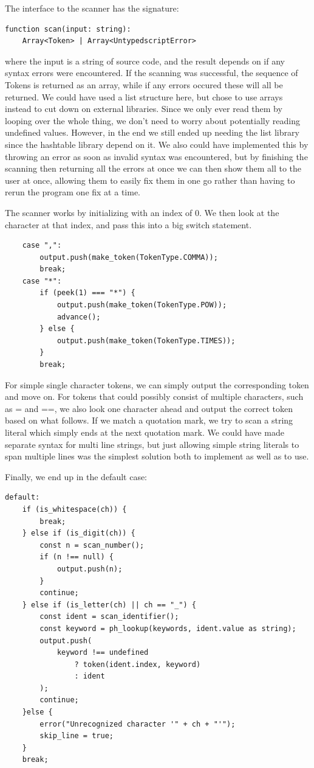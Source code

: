 \documentclass[12pt,a4paper]{article}
\begin{document}
The interface to the scanner has the signature:
\begin{lstlisting}[frame = none]
function scan(input: string): 
    Array<Token> | Array<UntypedscriptError>
\end{lstlisting}
where the input is a string of source code, and the result depends on if any syntax errors were encountered. If the scanning was successful, the sequence of Tokens is returned as an array, while if any errors occured these will all be returned. 
We could have used a list structure here, but chose to use arrays instead to cut down on external libraries. Since we only ever read them by looping over the whole thing, we don't need to worry about potentially reading undefined values. However, in the end we still ended up needing the list library since the hashtable library depend on it.
We also could have implemented this by throwing an error as soon as invalid syntax was encountered, but by finishing the scanning then returning all the errors at once we can then show them all to the user at once, allowing them to easily fix them in one go rather than having to rerun the program one fix at a time.

The scanner works by initializing with an index of 0. We then look at the character at that index, and pass this into a big switch statement.

\begin{lstlisting}
    case ",":
        output.push(make_token(TokenType.COMMA));
        break;
    case "*":
        if (peek(1) === "*") {
            output.push(make_token(TokenType.POW));
            advance();
        } else {
            output.push(make_token(TokenType.TIMES));
        }
        break;
\end{lstlisting}

For simple single character tokens, we can simply output the corresponding token and move on. For tokens that could possibly consist of multiple characters, such as = and ==, we also look one character ahead and output the correct token based on what follows.
If we match a quotation mark, we try to scan a string literal which simply ends at the next quotation mark. We could have made separate syntax for multi line strings, but just allowing simple string literals to span multiple lines was the simplest solution both to implement as well as to use.

Finally, we end up in the default case:
\begin{lstlisting}
default:
    if (is_whitespace(ch)) { 
        break;
    } else if (is_digit(ch)) {
        const n = scan_number();
        if (n !== null) {
            output.push(n);
        }
        continue;
    } else if (is_letter(ch) || ch == "_") {
        const ident = scan_identifier();
        const keyword = ph_lookup(keywords, ident.value as string);
        output.push(
            keyword !== undefined 
                ? token(ident.index, keyword) 
                : ident
        );
        continue;
    }else {
        error("Unrecognized character '" + ch + "'");
        skip_line = true;
    }
    break;
\end{lstlisting}
\end{document}
